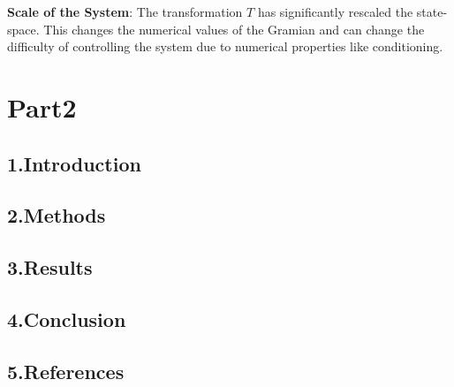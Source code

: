 \documentclass[12pt]{article}
\begin{document}
\textbf{Scale of the System}: The transformation $T$ has significantly rescaled the state-space. This changes the numerical values of the Gramian and can change the difficulty of controlling the system due to numerical properties like conditioning.


\newpage
\section*{Part2}
\subsection*{1.Introduction}


\subsection*{2.Methods}

\subsection*{3.Results}

\subsection*{4.Conclusion}

\subsection*{5.References}
\end{document}
